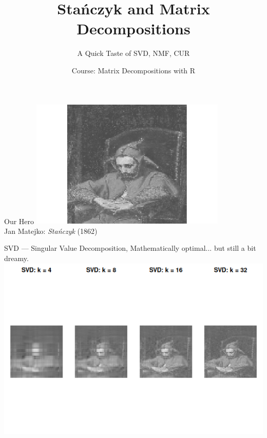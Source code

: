 \documentclass{beamer}
\title{Stańczyk and Matrix Decompositions}
\subtitle{A Quick Taste of SVD, NMF, CUR}
\author{Course: Matrix Decompositions with R}
\date{}
\begin{document}
\begin{frame}
  \titlepage
\end{frame}

\begin{frame}{Our Hero}
  \centering
  \includegraphics[width=0.7\textwidth]{128_128_stanczyk.png}\\[1ex]
  \Large Jan Matejko: \emph{Stańczyk} (1862)
\end{frame}

\begin{frame}{SVD — Singular Value Decomposition, Mathematically optimal... but still a bit dreamy.}
  \centering
  \includegraphics[width=1\textwidth]{decomposition_SVD_stanczyk.png}\\[1ex]
 \end{frame}
\end{document}

